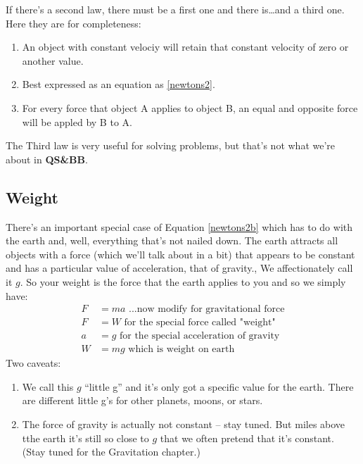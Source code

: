 \documentclass[
  letterpaper,
  DIV=11,
  numbers=noendperiod,
  oneside]{scrreprt}
\providecommand{\tightlist}{%
  \setlength{\itemsep}{0pt}\setlength{\parskip}{0pt}}\usepackage{longtable,booktabs,array}
\begin{document}
If there's a second law, there must be a first one and there
is\ldots and a third one. Here they are for completeness:

\begin{enumerate}
\def\labelenumi{\arabic{enumi}.}
\tightlist
\item
  An object with constant velociy will retain that constant velocity of
  zero or another value.
\item
  Best expressed as an equation as \eqref{newtons2}.
\item
  For every force that object A applies to object B, an equal and
  opposite force will be appled by B to A.
\end{enumerate}

The Third law is very useful for solving problems, but that's not what
we're about in \textbf{QS\&BB}.

\subsection{Weight}\label{sec-weight}

There's an important special case of Equation \ref{newtons2b} which has
to do with the earth and, well, everything that's not nailed down. The
earth attracts all objects with a force (which we'll talk about in a
bit) that appears to be constant and has a particular value of
acceleration, that of gravity., We affectionately call it \(g\). So your
weight is the force that the earth applies to you and so we simply have:
\[
\begin{align}
F &= ma \text{ ...now modify for gravitational force}\nonumber \\
F &= W \text{ for the special force called "weight"} \nonumber \\
a &= g \text{ for the special acceleration of gravity} \nonumber\\
W &=mg \text{ which is weight on earth} \label{weight}
\end{align}
\] Two caveats:

\begin{enumerate}
\def\labelenumi{\arabic{enumi}.}
\tightlist
\item
  We call this \(g\) ``little g'' and it's only got a specific value for
  the earth. There are different little g's for other planets, moons, or
  stars.
\item
  The force of gravity is actually not constant -- stay tuned. But miles
  above tthe earth it's still so close to \(g\) that we often pretend
  that it's constant. (Stay tuned for the Gravitation chapter.)
\end{enumerate}
\end{document}
